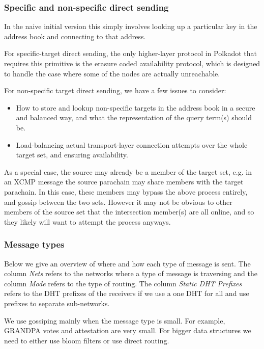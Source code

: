 \subsubsection{Specific and non-specific direct sending}

In the naive initial version this simply involves looking up a particular key in the address book and connecting to that address.

For specific-target direct sending, the only higher-layer protocol in Polkadot that requires this primitive is the erasure coded availability protocol, which is designed to handle the case where some of the nodes are actually unreachable.

For non-specific target direct sending, we have a few issues to consider:

\begin{itemize}
\item How to store and lookup non-specific targets in the address book in a secure and balanced way, and what the representation of the query term(s) should be.
\item Load-balancing actual transport-layer connection attempts over the whole target set, and ensuring availability.
\end{itemize}

As a special case, the source may already be a member of the target set, e.g. in an XCMP message the source parachain may share members with the target parachain. In this case, these members may bypass the above process entirely, and gossip between the two sets. However it may not be obvious to other members of the source set that the intersection member(s) are all online, and so they likely will want to attempt the process anyways.

\subsubsection{Message types}
Below we give an overview of where and how each type of message is sent. The column \emph{Nets} refers to the networks where a type of message is traversing and the column \emph{Mode} refers to the type of  routing. The column \emph{Static DHT Prefixes} refers to the DHT prefixes of the receivers if we use a one DHT for all and use prefixes to separate sub-networks.

We use gossiping mainly when the message type is small. For example, GRANDPA votes and attestation are very small. For bigger data structures we need to either use bloom filters or use direct routing.

